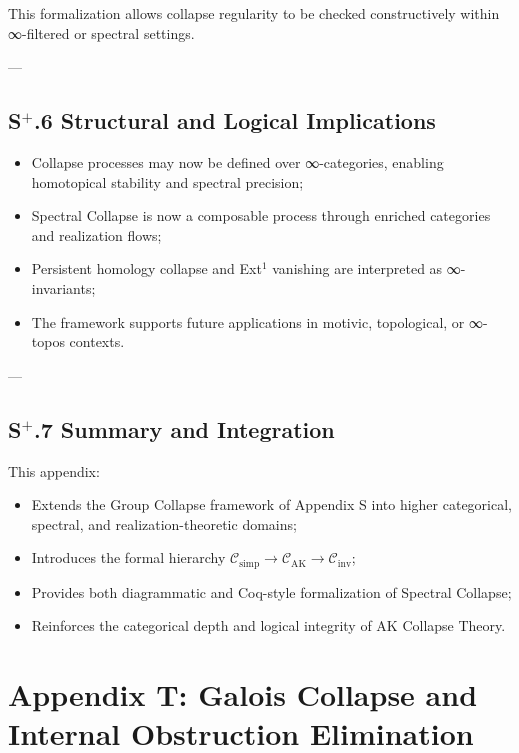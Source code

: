 \documentclass[11pt]{article}
\begin{document}
This formalization allows collapse regularity to be checked constructively within ∞-filtered or spectral settings.

---

\subsection*{S$^{+}$.6 Structural and Logical Implications}

\begin{itemize}
    \item Collapse processes may now be defined over ∞-categories, enabling homotopical stability and spectral precision;
    \item Spectral Collapse is now a composable process through enriched categories and realization flows;
    \item Persistent homology collapse and Ext$^1$ vanishing are interpreted as ∞-invariants;
    \item The framework supports future applications in motivic, topological, or ∞-topos contexts.
\end{itemize}

---

\subsection*{S$^{+}$.7 Summary and Integration}

This appendix:

\begin{itemize}
    \item Extends the Group Collapse framework of Appendix S into higher categorical, spectral, and realization-theoretic domains;
    \item Introduces the formal hierarchy $\mathcal{C}_{\mathrm{simp}} \to \mathcal{C}_{\mathrm{AK}} \to \mathcal{C}_{\mathrm{inv}}$;
    \item Provides both diagrammatic and Coq-style formalization of Spectral Collapse;
    \item Reinforces the categorical depth and logical integrity of AK Collapse Theory.
\end{itemize}




\section*{Appendix T: Galois Collapse and Internal Obstruction Elimination}
\end{document}
